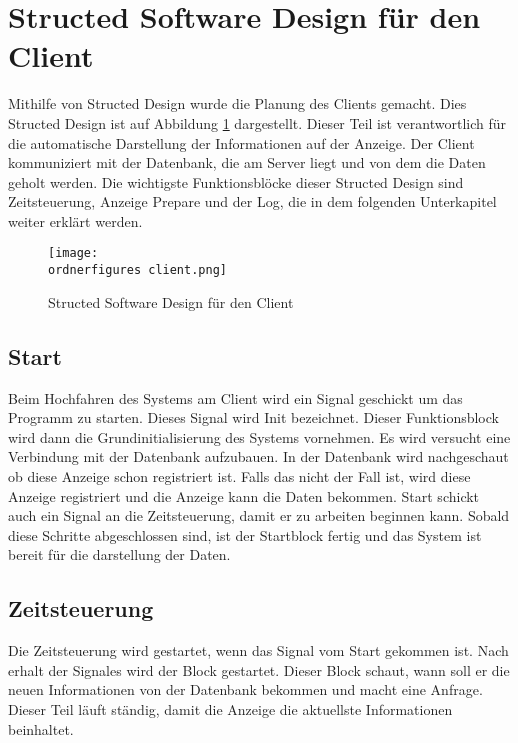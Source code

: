 
\section{Structed Software Design für den Client}

Mithilfe von Structed Design wurde die Planung des Clients gemacht. Dies Structed Design ist auf Abbildung \ref{fi:structed_design_client} dargestellt. 
Dieser Teil ist verantwortlich f\"{u}r die automatische Darstellung der Informationen auf der Anzeige. Der Client kommuniziert mit der Datenbank, die am Server liegt und von dem die Daten geholt werden. Die wichtigste Funktionsbl\"{o}cke dieser Structed Design sind Zeitsteuerung, Anzeige Prepare und der Log, die in dem folgenden Unterkapitel weiter erkl\"{a}rt werden.

\begin{figure}[ht]
	\centering
	\texttt{[image: \\ordnerfigures client.png]}
	\caption{Structed Software Design für den Client}
	\label{fi:structed_design_client}
\end{figure}

\subsection{Start}
Beim Hochfahren des Systems am Client wird ein Signal geschickt um das Programm zu starten. Dieses Signal wird Init bezeichnet. Dieser Funktionsblock wird dann die Grundinitialisierung des Systems vornehmen. Es wird versucht eine Verbindung mit der Datenbank aufzubauen. In der Datenbank wird nachgeschaut ob diese Anzeige schon registriert ist. Falls das nicht der Fall ist, wird diese Anzeige registriert und die Anzeige kann die Daten bekommen. Start schickt auch ein Signal an die Zeitsteuerung, damit er zu arbeiten beginnen kann. Sobald diese Schritte abgeschlossen sind, ist der Startblock fertig und das System ist bereit f\"ur die darstellung der Daten.

\subsection{Zeitsteuerung}
Die Zeitsteuerung wird gestartet, wenn das Signal vom Start gekommen ist. Nach erhalt der Signales wird der Block gestartet. Dieser Block schaut, wann soll er die neuen Informationen von der Datenbank bekommen und macht eine Anfrage. Dieser Teil l\"auft st\"andig, damit die Anzeige die aktuellste Informationen beinhaltet.

